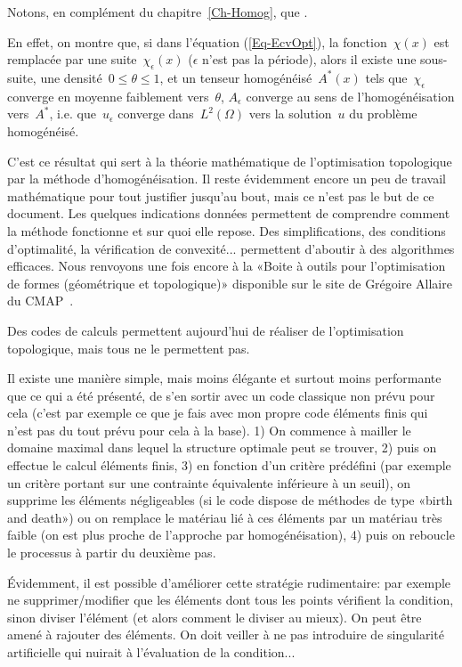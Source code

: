 \medskip
Notons, en complément du chapitre~\ref{Ch-Homog}, que .

En effet, on montre que, si dans l'équation (\ref{Eq-EcvOpt}), la fonction~$\chi(x)$ est remplacée par une suite~$\chi_\epsilon(x)$ ($\epsilon$ n'est pas la période), alors il existe une sous-suite, une densité~$0\le\theta\le1$, et un tenseur homogénéisé~$A^*(x)$ tels que~$\chi_\epsilon$ converge en moyenne faiblement vers~$\theta$, $A_\epsilon$ converge au sens de l'homogénéisation vers~$A^*$, i.e. que~$u_\epsilon$ converge dans~$L^2(\Omega)$ vers la solution~$u$ du problème homogénéisé.

\medskip
C'est ce résultat qui sert à la théorie mathématique de l'optimisation topologique par la méthode d'homogénéisation.
Il reste évidemment encore un peu de travail mathématique pour tout justifier jusqu'au bout, mais ce n'est pas le but de ce document. Les quelques indications données permettent de comprendre comment la méthode fonctionne et sur quoi elle repose.
Des simplifications, des conditions d'optimalité, la vérification de convexité... permettent d'aboutir à des algorithmes efficaces. Nous renvoyons une fois encore à la «Boite à outils \freefem pour l'optimisation de formes (géométrique et topologique)» disponible sur le site de Grégoire Allaire du CMAP~\cite{bib-AllaireOptimFF}.

\begin{remarque}
Des codes de calculs permettent aujourd'hui de réaliser de l'optimisation topologique, mais tous ne le permettent pas.

Il existe une manière simple, mais moins élégante et surtout moins performante que ce qui a été présenté, de s'en sortir avec un code classique non prévu pour cela (c'est par exemple ce que je fais avec mon propre code éléments finis qui n'est pas du tout prévu 
pour cela à la base).
1) On commence à mailler le domaine maximal dans lequel la structure optimale peut se trouver, 2) puis on effectue le calcul éléments finis, 3) en fonction d'un critère prédéfini (par exemple un critère portant sur une contrainte équivalente inférieure à un seuil), on supprime les éléments négligeables (si le code dispose de méthodes de type «birth and death») ou on remplace le matériau lié à ces éléments par un matériau très faible (on est plus proche de l'approche par homogénéisation), 4) puis on reboucle le processus à partir du deuxième pas. 

Évidemment, il est possible d'améliorer cette stratégie rudimentaire: par exemple ne supprimer/modifier que les éléments dont tous les points vérifient la condition, sinon diviser l'élément (et alors comment le diviser au mieux). On peut être amené à rajouter des éléments. On doit veiller à ne pas introduire de singularité artificielle qui nuirait à l'évaluation de la condition...
\end{remarque}

